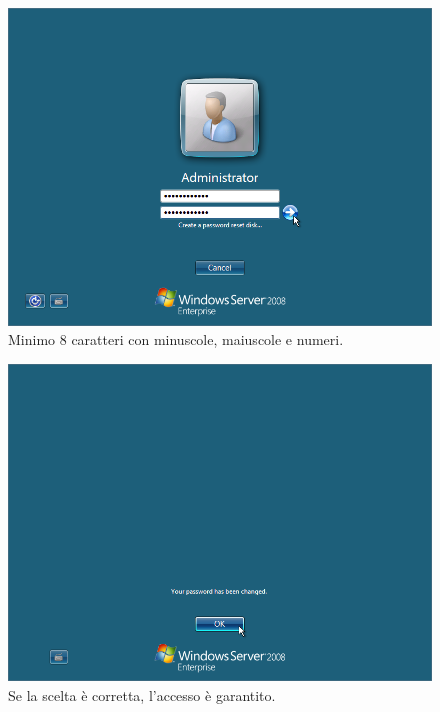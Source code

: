 \begin{figure}[htbp]
 \centering
 \includegraphics[scale=0.5]{images/grab0013}
 \caption{ Minimo 8 caratteri con minuscole, maiuscole e numeri.}
\label{fig:grab0013}
\end{figure}

\begin{figure}[htbp]
 \centering
 \includegraphics[scale=0.5]{images/grab0014}
 \caption{Se la scelta è corretta, l’accesso è garantito.}
\label{fig:grab0014}
\end{figure}

